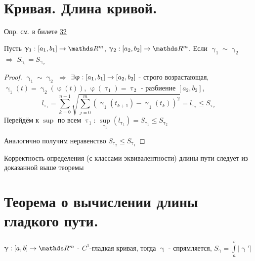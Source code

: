 \documentclass[matan]{subfiles}
\begin{document}
  \newpage
  \section{Кривая. Длина кривой.}

  Опр. см. в билете \hyperlink{q32}{32}
  \begin{theorem} 
      Пусть $\upgamma_1: [a_1,b_1] \rightarrow \R^m$, $\upgamma_2: [a_2,b_2] \rightarrow
      \R^m$. Если $\upgamma_1 \sim \upgamma_2$ $\Rightarrow$ $S_{\upgamma_1} = S_{\upgamma_2}$
  \end{theorem}

  \begin{proof}
      $\upgamma_1 \sim \upgamma_2$ $\Rightarrow$ $\exists \upvarphi: [a_1, b_1] \rightarrow [a_2, b_2]$ - строго возрастающая, $\upgamma_1(t) = \upgamma_2(\upvarphi(t))$, $\upvarphi(\uptau_1) = \uptau_2$ - разбиение $[a_2,b_2]$,
      $$l_{\uptau_1} = \sum\limits_{k=0}^{n-1} \sqrt{\sum\limits_{j=0}^m (\upgamma_1(t_{k+1}) - \upgamma_1(t_k))^2} = l_{\uptau_2} \leqslant S_{\uptau_2}$$
      Перейдём к $\sup$ по всем $\uptau_1$: $\sup\limits_{\uptau_1} (l_{\uptau_1}) = S_{\uptau_1} \leqslant S_{\uptau_2}$

      Аналогично получим неравенство $S_{\uptau_2} \leqslant S_{\uptau_1}$
  \end{proof}

  \begin{remark}
      Корректность определения (с классами эквивалентности) длины пути следует из доказанной выше теоремы
  \end{remark}

  \newpage
  \section{Теорема о вычислении длины гладкого пути.}

  \begin{theorem}
      $\upgamma: [a,b] \rightarrow \R^m$ - $C^1$-гладкая кривая, тогда $\upgamma$ - спрямляется, $S_{\upgamma} = \int\limits_a^b |\upgamma'|$
  \end{theorem}
\end{document}
